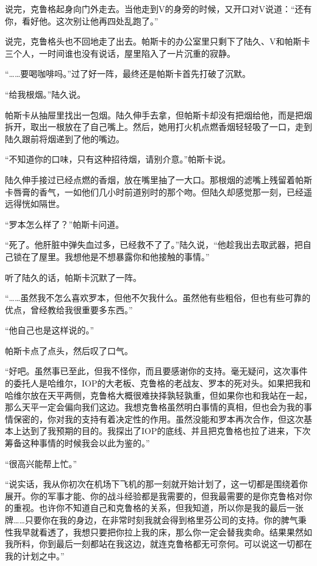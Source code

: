 说完，克鲁格起身向门外走去。当他走到V的身旁的时候，又开口对V说道：“还有你，看好他。这次别让他再四处乱跑了。”

说完，克鲁格头也不回地走了出去。帕斯卡的办公室里只剩下了陆久、V和帕斯卡三个人，一时间谁也没有说话，屋里陷入了一片沉重的寂静。

“……要喝咖啡吗。”过了好一阵，最终还是帕斯卡首先打破了沉默。

“给我根烟。”陆久说。

帕斯卡从抽屉里找出一包烟。陆久伸手去拿，但帕斯卡却没有把烟给他，而是把烟拆开，取出一根放在了自己嘴上。然后，她用打火机点燃香烟轻轻吸了一口，走到陆久跟前将烟递到了他的嘴边。

“不知道你的口味，只有这种招待烟，请别介意。”帕斯卡说。

陆久伸手接过已经点燃的香烟，放在嘴里抽了一大口。那根烟的滤嘴上残留着帕斯卡唇膏的香气，一如他们几小时前道别时的那个吻。但陆久却感觉那一刻，已经遥远得恍如隔世。

“罗本怎么样了？”帕斯卡问道。

“死了。他肝脏中弹失血过多，已经救不了了。”陆久说，“他趁我出去取武器，把自己锁在了屋里。我想他是不想暴露你和他接触的事情。”

听了陆久的话，帕斯卡沉默了一阵。

“……虽然我不怎么喜欢罗本，但他不欠我什么。虽然他有些粗俗，但也有些可靠的优点，曾经教给我很重要多东西。” 

“他自己也是这样说的。”

帕斯卡点了点头，然后叹了口气。

“好吧。虽然事已至此，但我不怪你，而且要感谢你的支持。毫无疑问，这次事件的委托人是哈维尔，IOP的大老板、克鲁格的老战友、罗本的死对头。如果把我和哈维尔放在天平两侧，克鲁格大概很难抉择孰轻孰重，但如果你也和我站在一起，那么天平一定会偏向我们这边。我想克鲁格虽然明白事情的真相，但也会为我的事情保密的，你对我的支持有着决定性的作用。虽然没能和罗本再次合作，但这次基本上达到了我预期的目的。我探出了IOP的底线、并且把克鲁格也拉了进来，下次筹备这种事情的时候我会以此为鉴的。”

“很高兴能帮上忙。”

“说实话，我从你初次在机场下飞机的那一刻就开始计划了，这一切都是围绕着你展开。你的军事才能、你的战斗经验都是我需要的，但我最需要的是你克鲁格对你的重视。也许你不知道自己和克鲁格的关系，但我知道，所以你是我的最后一张牌……只要你在我的身边，在非常时刻我就会得到格里芬公司的支持。你的脾气秉性我早就看透了，我想只要把你拉上我的床，那么你一定会替我卖命。结果果然如我所料，你到最后一刻都站在我这边，就连克鲁格都无可奈何。可以说这一切都在我的计划之中。”

